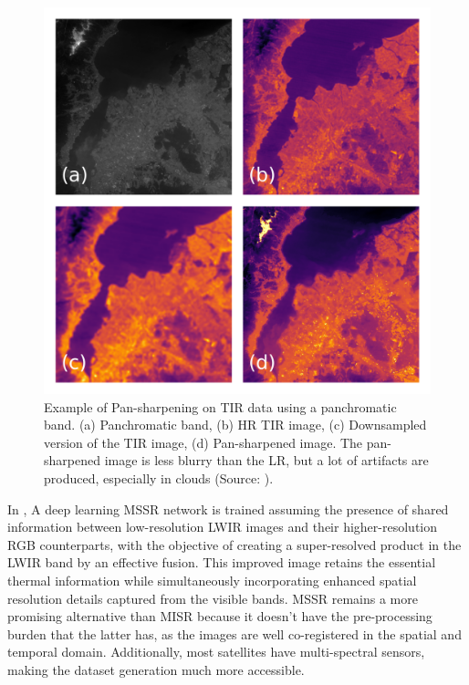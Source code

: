         \begin{figure}[H]
            \centering
            \includegraphics[width=\textwidth]{Includes/2-pansharpen.png}
            \caption{Example of Pan-sharpening on TIR data using a panchromatic band. (a) Panchromatic band, (b) HR TIR image, (c) Downsampled version of the TIR image, (d) Pan-sharpened image. 
            The pan-sharpened image is less blurry than the LR, but a lot of artifacts are produced, especially in clouds (Source: \cite{myself2023}).}
            \label{fig:2-pansharpening}
        \end{figure}

        In \cite{myself2023}, A deep learning MSSR network is trained assuming the presence of shared information between low-resolution LWIR images and their higher-resolution RGB counterparts, with the objective of creating a super-resolved product in the LWIR band by an effective fusion. This improved image retains the essential thermal information while simultaneously incorporating enhanced spatial resolution details captured from the visible bands. 
        MSSR remains a more promising alternative than MISR because it doesn't have the pre-processing burden that the latter has, as the images are well co-registered in the spatial and temporal domain.
        Additionally, most satellites have multi-spectral sensors, making the dataset generation much more accessible.

